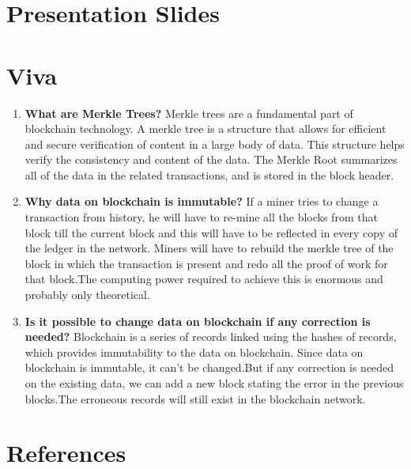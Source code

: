 \documentclass[12pt]{report}
\begin{document}
\begin{appendices}

\chapter*{\centering Presentation Slides}


\chapter*{Viva }
\begin{enumerate}[label=\textbf{\arabic*})]
  \item \textbf{What are Merkle Trees?}
  \newline
  \newline
  Merkle trees are a fundamental part of blockchain technology. A merkle tree is a structure that allows for efficient and secure verification of content in a large body of data. This structure helps verify the consistency and content of the data. The Merkle Root summarizes all of the data in the related transactions, and is stored in the block header.
  \item \textbf{Why data on blockchain is immutable?}
  \newline
  \newline  
  If a miner tries to change a transaction from history, he will have to re-mine all the blocks from that block till the current block and this will have to be reflected in every copy of the ledger in the network. Miners will have to rebuild the merkle tree of the block in which the transaction is present and redo all the proof of work for that block.The computing power required to achieve this is enormous and probably only theoretical.
    \item \textbf{Is it possible to change data on blockchain if any correction is needed?}
    \newline
    \newline
    Blockchain is a series of records linked using the hashes of records, which provides immutability to the data on blockchain. Since data on blockchain is immutable, it can't be changed.But if any correction is needed on the existing data, we can add a new block stating the error in the previous blocks.The erroneous records will still exist in the blockchain network.
    
\end{enumerate}
\chapter*{\centering References}







\end{appendices}
\end{document}
